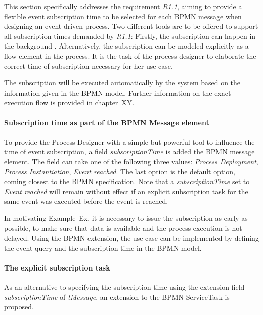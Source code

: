 This section specifically addresses the requirement \textit{R1.1}, aiming to provide a flexible event subscription time to be selected for each BPMN message when designing an event-driven process.
Two different tools are to be offered to support all subscription times demanded by \textit{R1.1}: Firstly, the subscription can happen in the background . Alternatively, the subscription can be modeled explicitly as a flow-element in the process.
It is the task of the process designer to elaborate the correct time of subscription necessary for her use case.

The subscription will be executed automatically by the system based on the information given in the BPMN model. Further information on the exact execution flow is provided in chapter~XY.


\paragraph{Subscription time as part of the BPMN Message element\newline}
To provide the Process Designer with a simple but powerful tool to influence the time of event subscription, a field \textit{subscriptionTime} is added the BPMN message element. 
The field can take one of the following three values: \textit{Process Deployment}, \textit{Process Instantiation}, \textit{Event reached}. The last option is the default option, coming closest to the BPMN specification.
Note that a \textit{subscriptionTime} set to \textit{Event reached} will remain without effect if an explicit subscription task for the same event was executed before the event is reached.


In motivating Example~Ex, it is necessary to issue the subscription as early as possible, to make sure that data is available and the process execution is not delayed. 
Using the BPMN extension, the use case can be implemented by defining the event query and the subscription time in the BPMN model. 

\paragraph{The explicit subscription task\newline}
As an alternative to specifying the subscription time using the extension field \textit{subscriptionTime} of \textit{tMessage}, an extension to the BPMN ServiceTask is proposed. 

